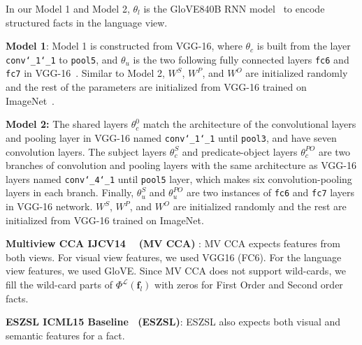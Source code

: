 \documentclass[runningheads]{llncs}
\begin{document}
In our Model 1 and Model 2, $\theta_l$ is the GloVE840B RNN model~\cite{pennington2014glove} to encode structured facts in the language view. %
\item{\textbf{Model 1}:} Model 1 is constructed from VGG-16, where  $\theta_c$ is built from the layer \texttt{conv\char`_1\char`_1} to \texttt{pool5}, and  $\theta_u$ is the two following fully connected layers \texttt{fc6} and  \texttt{fc7} in VGG-16~\cite{simonyan2014very}. Similar to Model 2,  $W^S$, $W^P$, and  $W^O$  are initialized randomly  and the rest of the parameters are initialized from VGG-16 trained on ImageNet~\cite{deng2009imagenet}.
\item \noindent\textbf{Model 2:} The shared layers $\theta_c^{0}$ match the architecture of the convolutional layers and pooling layer in VGG-16 named  \texttt{conv\char`_1\char`_1} until \texttt{pool3}, and have seven convolution layers. The subject layers $\theta_c^{S}$ and predicate-object layers $\theta_c^{{PO}}$ are two branches of convolution and pooling layers with the same architecture as VGG-16 layers  named  \texttt{conv\char`_4\char`_1} until \texttt{pool5} layer, which makes six convolution-pooling layers in each branch. Finally, $\theta_u^{S}$  and  $\theta_u^{{PO}}$ are two instances of \texttt{fc6} and \texttt{fc7} layers in VGG-16 network.
$W^S$, $W^P$, and  $W^O$  are initialized randomly and the rest are initialized from VGG-16 trained on ImageNet.
	\item \textbf{Multiview CCA IJCV14 ~\cite{gong2014multi} (MV CCA) }: MV CCA expects features from both views. For visual view features, we used VGG16 (FC6).
For the language view features, we used GloVE.
Since MV CCA does not support wild-cards, we fill the wild-card parts of $\Phi^\mathcal{L}(\mathbf{f}_l)$ with zeros for First Order and Second order facts.
	\item \textbf{ESZSL ICML15 Baseline~\cite{romera2015embarrassingly} (ESZSL)}: ESZSL also expects both visual and semantic features for a fact.
\end{document}
